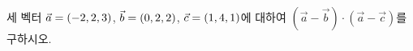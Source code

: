 세 벡터 $\vec{a}=(-2{,}\mkern3mu\mathopen{}2{,}\mkern3mu\mathopen{}3)$, $\vec{b}=(0{,}\mkern3mu\mathopen{}2{,}\mkern3mu\mathopen{}2)$, $\vec{c}=(1{,}\mkern3mu\mathopen{}4{,}\mkern3mu\mathopen{}1)$에 대하여 $(\vec{a}-\vec{b})\cdot(\vec{a}-\vec{c})$를 구하시오.
